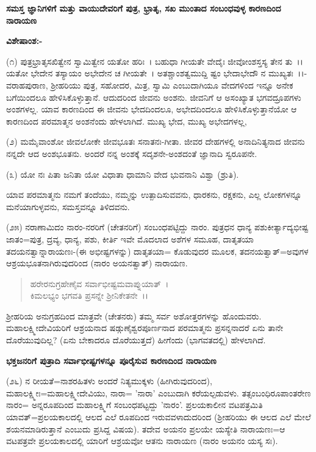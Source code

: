 \begin{center}
\textbf{ಸಮಸ್ತ ಜ್ಞಾನಿಗಳಿಗೆ ಮತ್ತು ವಾಯುದೇವರಿಗೆ ಪುತ್ರ, ಭ್ರಾತೃ, ಸಖ ಮುಂತಾದ ಸಂಬಂಧವುಳ್ಳ ಕಾರಣದಿಂದ ನಾರಾಯಣ}
\end{center}

\noindent
\textbf{ವಿಶೇಷಾಂಶ:-}

(೧) ಪುತ್ರಭ್ರಾತೃಸಖಿತ್ವೇನ ಸ್ವಾಮಿತ್ವೇನ ಯತೋ ಹರಿಃ~। ಬಹುಧಾ ಗೀಯತೇ ವೇದೈಃ ಜೀವೋಂಶಸ್ತಸ್ಯ ತೇನ ತು~।। ಯತೋ ಭೇದೇನ ತಸ್ಯಾಯಂ ಅಭೇದೇನ ಚ ಗೀಯತೇ~। ಅತಶ್ಚಾಂಶತ್ವಮುದ್ದಿ ಷ್ಟಂ ಭೇದಾಭೇದೌ ನ ಮುಖ್ಯತಃ~।।-ವರಾಹಪುರಾಣ, ಶ‍್ರೀಹರಿಯು ಪುತ್ರ, ಸಹೋದರ, ಮಿತ್ರ, ಸ್ವಾಮಿ ಎಂಬುದಾಗಿಯೂ ವೇದಗಳಿಂದ ಇನ್ನೂ ಅನೇಕ ಬಗೆಯಿಂದಲೂ ಹೇಳಿಸಿಕೊಳ್ಳುತ್ತಾನೆ. ಆದುದರಿಂದ ಜೀವನು ಅಂಶನು. ಜೀವನಿಗೆ ಆ ಅಸಂಖ್ಯಾತ ಭಗವದ್ರೂಪಗಳು ಅಂಶಗಳಲ್ಲ. ಯಾವ ಕಾರಣದಿಂದ ಈ ಜೀವನು ಭೇದದಿಂದಲೂ, ಅಭೇದದಿಂದಲೂ ಹೇಳಿಸಿಕೊಳ್ಳುತ್ತಾನೆಯೋ ಆ ಕಾರಣದಿಂದ ಪರಮಾತ್ಮನ ಅಂಶನೆಂದು ಹೇಳಲಾಗಿದೆ. ಮುಖ್ಯ ಭೇದ, ಮುಖ್ಯ ಅಭೇದಗಳಲ್ಲ,

(೨) ಮಮೈವಾಂಶೋ ಜೀವಲೋಕೇ ಜೀವಭೂತಃ ಸನಾತನಃ-ಗೀತಾ. ಜೀವರ ದೇಹಗಳಲ್ಲಿ ಅನಾದಿನಿತ್ಯನಾದ ಜೀವನು ನನ್ನದೇ ಆದ ಅಂಶಭೂತನು. ಅಂದರೆ ನನ್ನ ಅಂಶಕ್ಕೆ ಸದೃಶನೇ-ಅಂಶದಂತೆ ಜ್ಞಾನಾದಿ ಸ್ವರೂಪನೇ.

(೩) ಯೋ ನಃ ಪಿತಾ ಜನಿತಾ ಯೋ ವಿಧಾತಾ ಧಾಮಾನಿ ವೇದ ಭುವನಾನಿ ವಿಶ್ವಾ (ಶ್ರುತಿ).

ಯಾವ ಪರಮಾತ್ಮನು ನಮಗೆ ತಂದೆಯು, ನಮ್ಮನ್ನು ಉತ್ಪಾದಿಸುವವನು, ಧಾರಕನು, ರಕ್ಷಕನು, ಎಲ್ಲ ಲೋಕಗಳನ್ನೂ ಮನೆಯಾಗುಳ್ಳವನು, ಸಮಸ್ತವನ್ನೂ ತಿಳಿದವನು.

(೨೫) ನರಾಣಾಮಿದಂ ನಾರಂ-ನರರಿಗೆ (ಚೇತನರಿಗೆ) ಸಂಬಂಧಪಟ್ಟಿದ್ದು ನಾರಂ. ಪುತ್ರಧನ ಧಾನ್ಯ ಪಶುಕೀರ್ತ್ಯಾದ್ಯಭೀಷ್ಟ ಜಾತಂ=ಪುತ್ರ, ದ್ರವ್ಯ, ಧಾನ್ಯ, ಪಶು, ಕೀರ್ತಿ ಇವೇ ಮೊದಲಾದ ಅಶೆಗಳ ಸಮೂಹ, ದಾತೃತಯಾ ತದಯನತ್ವಾನ್ನಾರಾಯಣಃ-(ಈ ಅಭೀಷ್ಟಗಳನ್ನು) ದಾತೃತಯಾ= ಕೊಡುವುದರ ಮೂಲಕ, ತದನಯತ್ವಾತ್=ಅವುಗಳ ಆಶ್ರಯಭೂತನಾಗಿರುವುದರಿಂದ (ನಾರಂ ಅಯನತ್ವಾತ್) ನಾರಾಯಣ.

\begin{verse}
ಹರೇರನುಗ್ರಹೇಣೈವ ಸರ್ವಾಭೀಷ್ಟಮವಾಪ್ನುಯಾತ್~।\\ ಕಿಮಲಭ್ಯಂ ಭಗವತಿ ಪ್ರಸನ್ನೇ ಶ‍್ರೀನಿಕೇತನೇ~।।
\end{verse}

ಶ‍್ರೀಹರಿಯ ಅನುಗ್ರಹದಿಂದ ಮಾತ್ರವೇ (ಚೇತನರು) ತಮ್ಮ ಸರ್ವ ಅಶೋತ್ತರಗಳನ್ನು ಹೊಂದುವರು. ಮಹಾಲಕ್ಷ್ಮೀದೇವಿಯರಿಗೆ ಆಶ್ರಯನಾದ ಷಡ್ಗುಣೈಶ್ವರಪೂರ್ಣನಾದ ಪರಮಾತ್ಮನು ಪ್ರಸನ್ನನಾದರೆ ಏನು ತಾನೇ ದೊರೆಯುವುದಿಲ್ಲ? (ಏನು ಬೇಕಾದರೂ ದೊರೆಯುತ್ತದೆ) ಹೀಗೆಂದು (ಭಾಗವತದಲ್ಲಿ) ಹೇಳಲಾಗಿದೆ.

\begin{center}
\textbf{ಭಕ್ತಜನರಿಗೆ ಪುತ್ರಾದಿ ಸರ್ವಾಭೀಷ್ಟಗಳನ್ನೂ ಪೂರೈಸುವ ಕಾರಣದಿಂದ ನಾರಾಯಣ}
\end{center}

(೨೬) ನ ರೀಯತೆ=ನಾಶರಹಿತಳು ಅಂದರೆ ನಿತ್ಯಮುಕ್ಕಳು (ಹೀಗಿರುವುದರಿಂದ), ಮಹಾಲಕ್ಷ್ಮೀಃ=ಮಹಾಲಕ್ಷ್ಮೀದೇವಿಯು, ನಾರಾ= 'ನಾರಾ' ಎಂಬುದಾಗಿ ಕರೆಯಲ್ಪಡುವಳು. ತತ್ಸಂಬಂಧಿರೂಪಾಂತರೇಣ ನಾರಂ= ಅನ್ನರೂಪದಿಂದ ಮಹಾಲಕ್ಷ್ಮಿಗೆ ಸಂಬಂಧಪಟ್ಟದ್ದು 'ನಾರಂ'. ಪ್ರಲಯಕಾಲೀನ ವಟಪತ್ರಮಿತಿ ಯಾವತ್=ಪ್ರಲಯಕಾಲದಲ್ಲಿ ಆಲದ ಎಲೆ ರೂಪದಿಂದ ಇರುವವಳಾದುದರಿಂದ (ಶ‍್ರೀಹರಿಯು ಈ ಆಲದ ಎಲೆ ಮೇಲೆ ಶಯನಮಾಡಿರುತ್ತಾನೆ ಎಂಬುದು ಪ್ರಸಿದ್ದ ವಿಷಯ). ತದೇವ ಅಯನಂ ಪ್ರಲಯೇ ಯಸ್ಯೇತಿ ನಾರಾಯಣಃ=ಆ ವಟಪತ್ರವೇ ಪ್ರಲಯಕಾಲದಲ್ಲಿ ಯಾರಿಗೆ ಆಶ್ರಯವೋ ಆತನು ನಾರಾಯಣ (ನಾರಂ ಅಯನಂ ಯಸ್ಯ ಸಃ).

